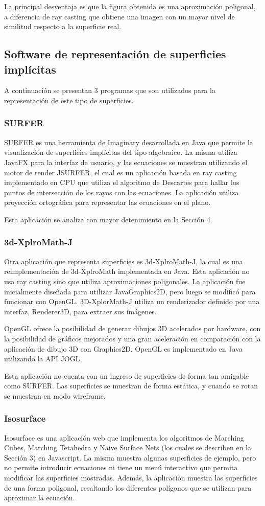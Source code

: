 \documentclass[12pt]{article}
\begin{document}
La principal desventaja es que la figura obtenida es una aproximación poligonal, a diferencia de ray casting que obtiene una imagen con un mayor nivel de similitud respecto a la superficie real\cite{realtimerendering}.

\subsection{Software de representación de superficies implícitas}
\noindent A continuación se presentan 3 programas que son utilizados para la representación de este tipo de superficies.
\subsubsection{SURFER}
\noindent SURFER es una herramienta de Imaginary desarrollada en Java que permite la visualización de superficies implícitas del tipo algebraico. La misma utiliza JavaFX para la interfaz de usuario, y las ecuaciones se muestran utilizando el motor de render JSURFER, el cual es un aplicación basada en ray casting implementado en CPU que utiliza el algoritmo de Descartes para hallar los puntos de intersección de los rayos con las ecuaciones. La aplicación utiliza proyección ortográfica para representar las ecuaciones en el plano.

Esta aplicación se analiza con mayor detenimiento en la Sección 4.
\subsubsection{3d-XplroMath-J}
\noindent Otra aplicación que representa superficies es 3d-XplroMath-J, la cual es una reimplementación de 3d-XplroMath implementada en Java. Esta aplicación no usa ray casting sino que utiliza aproximaciones poligonales. La aplicación fue inicialmente diseñada para utilizar JavaGraphics2D, pero luego se modificó para funcionar con OpenGL. 3D-XplorMath-J utiliza un  renderizador definido por una interfaz, Renderer3D, para extraer sus imágenes. 

OpenGL ofrece la posibilidad de generar dibujos 3D acelerados por hardware, con la posibilidad de gráficos mejorados y una gran aceleración en comparación con la aplicación de dibujo 3D con Graphics2D. OpenGL es implementado en Java utilizando la API JOGL.

Esta aplicación no cuenta con un ingreso de superficies de forma tan amigable como SURFER. Las superficies se muestran de forma estática, y cuando se rotan se muestran en modo wireframe.
\subsubsection{Isosurface}
\noindent Isosurface es una aplicación web que implementa los algoritmos de Marching Cubes, Marching Tetahedra y Naive Surface Nets (los cuales se describen en la Sección 3) en Javascript. La misma muestra algunas superficies de ejemplo, pero no permite introducir ecuaciones ni tiene un menú interactivo que permita modificar las superficies mostradas. Además, la aplicación muestra las superficies de una forma poligonal, resaltando los diferentes polígonos que se utilizan para aproximar la ecuación.  
\end{document}
